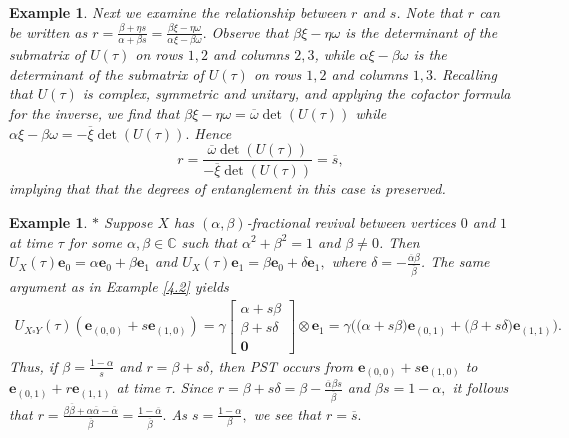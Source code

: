 \documentclass{article}
\numberwithin{equation}{section}
\newtheorem{ex}[lemma]{Example}
\newcommand{\be}{\mathbf e}
\def\C{\mathbb{C}}
\begin{document}
{\begin{ex}
{\rm{
Next we examine the relationship between $r$ and $s$. Note that $r$ can be written as $r=\frac{\beta + \eta s}{\alpha + \beta s} = \frac{\beta \xi - \eta \omega}{\alpha \xi- \beta \omega}.$ Observe that $\beta \xi - \eta \omega$ is the determinant of the submatrix of $U(\tau)$ on rows $1,2$ and columns $2,3$, while $\alpha \xi- \beta \omega$ is the determinant of the submatrix of $U(\tau)$ on rows $1,2$ and columns $1,3.$ Recalling that $U(\tau)$ is complex, symmetric and unitary, and applying the cofactor formula for the inverse, we find that $\beta \xi - \eta \omega = \overline{\omega} \det(U(\tau))$ while  $\alpha \xi- \beta \omega=- \overline{\xi} \det(U(\tau)).$ Hence 
\begin{equation*}
r=\frac{\overline{\omega} \det(U(\tau))}{- \overline{\xi} \det(U(\tau))} = \overline{s},
\end{equation*}
implying that that the degrees of entanglement in this case is preserved.}}
\end{ex}

\begin{ex} {\rm{
$*$ Suppose $X$ has $(\alpha,\beta)$-fractional revival between vertices $0$ and $1$ at time $\tau$ for some $\alpha,\beta\in\C$ such that $\alpha^2+\beta^2=1$ and $\beta\neq 0$. Then $U_{X}(\tau)\be_{0}=\alpha\be_0+\beta\be_1$ and $U_{X}(\tau)\be_{1}=\beta\be_0+ \delta\be_1,$
where $\delta=-\frac{\overline{\alpha}\beta}{\overline{\beta}}$. The same argument as in Example \ref{4.2} yields
\begin{equation*}
\begin{split}
U_{X\square Y}(\tau)(\be_{(0,0)}+s\be_{(1,0)})
=\gamma \begin{bmatrix}\alpha+s\beta\\ \beta+s\delta \\ \textbf{0}\end{bmatrix}\otimes \be_{1}=\gamma\bigg(\big(\alpha+s\beta\big)\be_{(0,1)}+\big(\beta+s\delta\big)\be_{(1,1)}\bigg).
\end{split}
\end{equation*}
Thus, if $\beta=\frac{1-\alpha}{s}$ and $r=\beta+s\delta$, then PST occurs from $\be_{(0,0)}+s\be_{(1,0)}$ to $\be_{(0,1)}+r\be_{(1,1)}$ at time $\tau$. Since $r=\beta + s\delta =\beta -\frac{\overline{\alpha} \beta s}{\overline{\beta}}$ and $\beta s =1-\alpha,$ it follows that $r=\frac{\beta \overline{\beta} + \alpha \overline{\alpha}-\overline{\alpha}}{\overline{\beta}}= \frac{1-\overline{\alpha}}{\overline{\beta}}.$ As $s=\frac{1-{\alpha}}{{\beta}},$ we see that $r=\overline{s}.$ }}
\end{ex}

}
\end{document}
